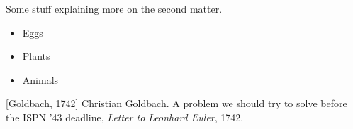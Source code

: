 \documentclass{beamer}
\begin{document}
\frame
{
    Some stuff explaining more on the second matter.
}

\begin{frame}
    \begin{itemize}
    \item<1-> Eggs
    \item<2-> Plants
    \item<3-> Animals
    \end{itemize}
\end{frame}

\begin{thebibliography}{10}
    [Goldbach, 1742]
    Christian Goldbach.
    \newblock A problem we should try to solve before the ISPN ’43 deadline,
    \newblock \emph{Letter to Leonhard Euler}, 1742.
\end{thebibliography}
\end{document}

